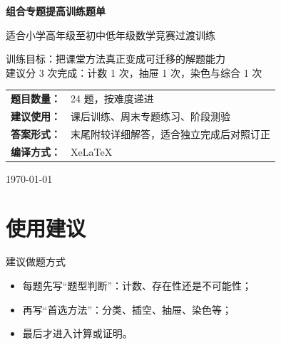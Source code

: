 \documentclass[11pt,a4paper,fontset=fandol]{ctexart}
\theoremstyle{formalexample}
\begin{document}
\thispagestyle{empty}
\begin{titlepage}
\centering
\vspace*{0.9cm}
\begin{tcolorbox}[
  enhanced,
  width=0.92\textwidth,
  colback=white,
  colframe=mainblue,
  boxrule=1pt,
  arc=0mm,
  left=6mm,
  right=6mm,
  top=8mm,
  bottom=8mm
]
\centering
{\fontsize{24}{30}\selectfont\bfseries 组合专题提高训练题单\par}
\vspace{0.6cm}
{\fontsize{17}{22}\selectfont 适合小学高年级至初中低年级数学竞赛过渡训练\par}

\vspace{1cm}
\begin{tcolorbox}[colback=lightblue,colframe=mainblue,width=0.84\textwidth,boxrule=1pt]
\centering
{\large 训练目标：把课堂方法真正变成可迁移的解题能力}\\[0.35em]
{\normalsize 建议分 3 次完成：计数 1 次，抽屉 1 次，染色与综合 1 次}
\end{tcolorbox}

\vspace{1cm}
\renewcommand{\arraystretch}{1.42}
\begin{tabular}{>{\bfseries}p{3.5cm}p{8cm}}
题目数量： & 24 题，按难度递进 \\
建议使用： & 课后训练、周末专题练习、阶段测验 \\
答案形式： & 末尾附较详细解答，适合独立完成后对照订正 \\
编译方式： & XeLaTeX \\
\end{tabular}

\vspace{0.9cm}
{\large \today\par}
\end{tcolorbox}
\end{titlepage}

\tableofcontents
\newpage

\section{使用建议}

\begin{goalbox}{建议做题方式}
\begin{itemize}
  \item 每题先写“题型判断”：计数、存在性还是不可能性；
  \item 再写“首选方法”：分类、插空、抽屉、染色等；
  \item 最后才进入计算或证明。
\end{itemize}
\end{goalbox}
\end{document}
